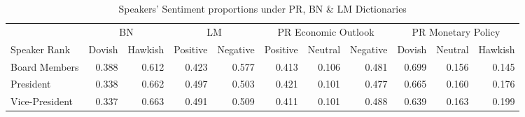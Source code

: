 \begin{table} [!ht]
\centering
\caption{Speakers' Sentiment proportions under PR, BN \& LM Dictionaries}
\label{speakersent}
\begin{adjustbox}{width=\textwidth}
\begin{tabular}[t]{lrrrrrrrrrr}
\toprule
\multicolumn{1}{c}{ } & \multicolumn{2}{c}{BN} & \multicolumn{2}{c}{LM} & \multicolumn{3}{c}{PR Economic Outlook} & \multicolumn{3}{c}{PR Monetary Policy} \\
\cmidrule(l{3pt}r{3pt}){2-3} \cmidrule(l{3pt}r{3pt}){4-5} \cmidrule(l{3pt}r{3pt}){6-8} \cmidrule(l{3pt}r{3pt}){9-11}
Speaker Rank & Dovish & Hawkish & Positive & Negative & Positive & Neutral & Negative & Dovish & Neutral & Hawkish\\
\midrule
Board Members & 0.388 & 0.612 & 0.423 & 0.577 & 0.413 & 0.106 & 0.481 & 0.699 & 0.156 & 0.145\\
President & 0.338 & 0.662 & 0.497 & 0.503 & 0.421 & 0.101 & 0.477 & 0.665 & 0.160 & 0.176\\
Vice-President & 0.337 & 0.663 & 0.491 & 0.509 & 0.411 & 0.101 & 0.488 & 0.639 & 0.163 & 0.199\\
\bottomrule
\end{tabular}
\end{adjustbox}
\end{table}
